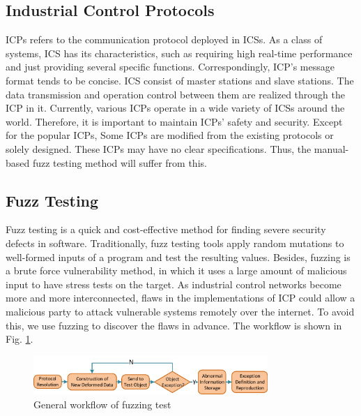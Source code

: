 \subsection{Industrial Control Protocols}
ICPs refers to the communication protocol deployed in ICSs. As a class of systems, ICS has its characteristics, such as requiring high real-time performance and just providing several specific functions. Correspondingly, ICP's message format tends to be concise. ICS consist of master stations and slave stations. The data transmission and operation control between them are realized through the ICP in it. Currently, various ICPs operate in a wide variety of ICSs around the world. Therefore, it is important to maintain ICPs' safety and security. Except for the popular ICPs, Some ICPs are modified from the existing protocols or solely designed. These ICPs may have no clear specifications. Thus, the manual-based fuzz testing method will suffer from this.

\subsection{Fuzz Testing}
Fuzz testing is a quick and cost-effective method for finding severe security defects in software. Traditionally, fuzz testing tools apply random mutations to well-formed inputs of a program and test the resulting values. Besides, fuzzing is a brute force vulnerability method, in which it uses a large amount of malicious input to have stress tests on the target. As industrial control networks become more and more interconnected, flaws in the implementations of ICP could allow a malicious party to attack vulnerable systems remotely over the internet. To avoid this, we use fuzzing to discover the flaws in advance. The workflow is shown in Fig.  \ref{FigFuzzingFlow}.
\begin{figure}[htbp]
	\centering
	\includegraphics[width=3.5in]{FIGURE_LV/FigFuzzingFlow.pdf}
	\caption{General workflow of fuzzing test}
	\label{FigFuzzingFlow}
\end{figure}

